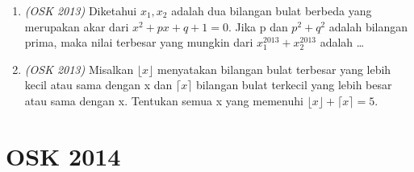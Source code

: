 \documentclass[11pt]{scrartcl}
\begin{document}
\begin{enumerate}
\item \textit{(OSK 2013)} Diketahui $x_1, x_2$ adalah dua bilangan bulat berbeda yang merupakan akar dari $x^2 + px + q + 1 = 0$. Jika p dan $p^2 + q^2$ adalah bilangan prima, maka nilai terbesar yang mungkin dari $x_1^{2013} + x_2^{2013}$ adalah \dots

\item \textit{(OSK 2013)} Misalkan $\lfloor x \rfloor$ menyatakan bilangan bulat terbesar yang lebih kecil atau sama dengan x dan $\lceil x \rceil$ bilangan bulat terkecil yang lebih besar atau sama dengan x. Tentukan semua x yang memenuhi $\lfloor x \rfloor + \lceil x \rceil = 5$.

\end{enumerate}
\newpage

\section{OSK 2014}
\end{document}
